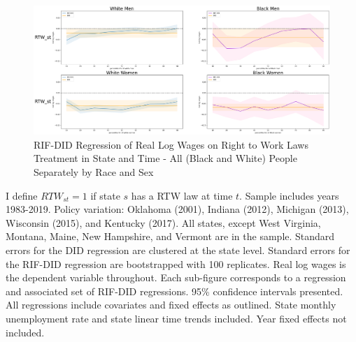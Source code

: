\documentclass[11pt]{article}
\begin{document}
{\pagebreak
\begin{landscape}
\begin{figure}[ht!]
\centering
    \caption{RIF-DID Regression of Real Log Wages on Right to Work Laws Treatment in State and Time - All (Black and White) People Separately by Race and Sex}\label{fig:rifdid-sltt-bw-A}
    \includegraphics[width=1.25\textwidth, height = \textheight, keepaspectratio]{figures/fin_rifdid-sltt-bw-A.png}
\end{figure}
\footnotesize{I define $RTW_{st} = 1$ if state $s$ has a RTW law at time $t$. Sample includes years 1983-2019. Policy variation: Oklahoma (2001), Indiana (2012), Michigan (2013), Wisconsin (2015), and Kentucky (2017). All states, except West Virginia, Montana, Maine, New Hampshire, and Vermont are in the sample. Standard errors for the DID regression are clustered at the state level. Standard errors for the RIF-DID regression are bootstrapped with 100 replicates. Real log wages is the dependent variable throughout. Each sub-figure corresponds to a regression and associated set of RIF-DID regressions. 95\% confidence intervals presented. All regressions include covariates and fixed effects as outlined. State monthly unemployment rate and state linear time trends included. Year fixed effects not included.}
\end{landscape}

}
\end{document}
